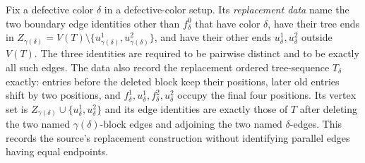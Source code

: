 \begin{definition}
Fix a defective color $\delta$ in a defective-color setup.  Its
\emph{replacement data} name the two boundary edge identities other than
$f^0_\delta$ that have color $\delta$, have their tree ends in
$Z_{\gamma(\delta)}=V(T)\setminus
\{u^1_{\gamma(\delta)},u^2_{\gamma(\delta)}\}$, and have their other ends
$u^1_\delta,u^2_\delta$ outside $V(T)$.  The three identities are required
to be pairwise distinct and to be exactly all such edges.  The data also
record the replacement ordered tree-sequence $T_\delta$ exactly: entries
before the deleted block keep their positions, later old entries shift by
two positions, and $f^1_\delta,u^1_\delta,f^2_\delta,u^2_\delta$ occupy
the final four positions.  Its vertex set is
$Z_{\gamma(\delta)}\cup\{u^1_\delta,u^2_\delta\}$ and its edge identities
are exactly those of $T$ after deleting the two named
$\gamma(\delta)$-block edges and adjoining the two named
$\delta$-edges.  This records the source's replacement construction
without identifying parallel edges having equal endpoints.
\end{definition}
